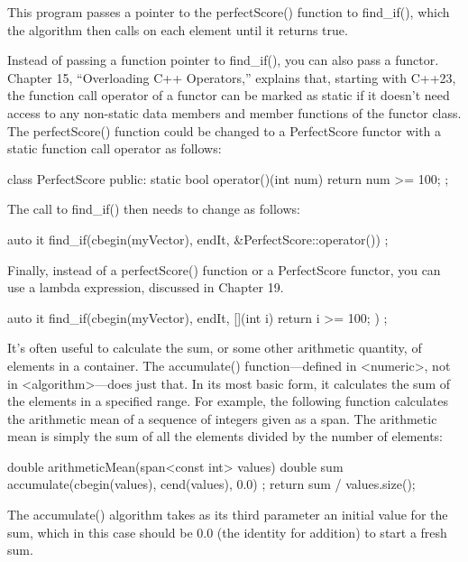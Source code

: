 This program passes a pointer to the perfectScore() function to find\_if(), which the algorithm then calls on each element until it returns true.


Instead of passing a function pointer to find\_if(), you can also pass a functor. Chapter 15, “Overloading C++ Operators,” explains that, starting with C++23, the function call operator of a functor can be marked as static if it doesn’t need access to any non-static data members and member functions of the functor class. The perfectScore() function could be changed to a PerfectScore functor with a static function call operator as follows:

\begin{cpp}
class PerfectScore
{
    public:
        static bool operator()(int num) { return num >= 100; }
};
\end{cpp}

The call to find\_if() then needs to change as follows:

\begin{cpp}
auto it { find_if(cbegin(myVector), endIt, &PerfectScore::operator()) };
\end{cpp}

Finally, instead of a perfectScore() function or a PerfectScore functor, you can use a lambda expression, discussed in Chapter 19.

\begin{cpp}
auto it { find_if(cbegin(myVector), endIt, [](int i){ return i >= 100; }) };
\end{cpp}



It’s often useful to calculate the sum, or some other arithmetic quantity, of elements in a container. The accumulate() function—defined in <numeric>, not in <algorithm>—does just that. In its most basic form, it calculates the sum of the elements in a specified range. For example, the following function calculates the arithmetic mean of a sequence of integers given as a span. The arithmetic mean is simply the sum of all the elements divided by the number of elements:

\begin{cpp}
double arithmeticMean(span<const int> values)
{
    double sum { accumulate(cbegin(values), cend(values), 0.0) };
    return sum / values.size();
}
\end{cpp}

The accumulate() algorithm takes as its third parameter an initial value for the sum, which in this case should be 0.0 (the identity for addition) to start a fresh sum.

